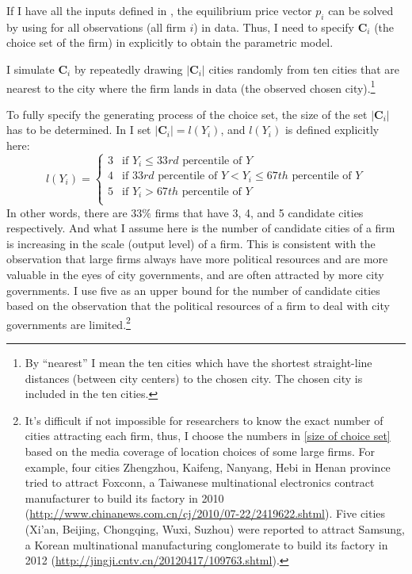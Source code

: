 

If I have all the inputs defined in , the equilibrium price
vector $p_i$ can be solved by using 
for all observations (all firm $i$) in data.
Thus, I need to specify $\mathbf{C}_i$
(the choice set of the firm) in  explicitly to obtain the parametric model.

I simulate $\mathbf{C}_{i}$ by repeatedly drawing
$|\mathbf{C}_{i}|$ cities randomly from ten cities that are nearest
to the city where the firm lands in data (the observed chosen city).\footnote{
    By ``nearest'' I mean the ten cities which have
    the shortest straight-line distances (between city centers) to the chosen city.
    The chosen city is included in the ten cities. }

To fully specify the generating process of the choice set,
the size of the set $|\mathbf{C}_i|$ has to be determined.
In  I set $|\mathbf{C}_i| = l(Y_i)$,
and $l(Y_i)$ is defined explicitly here:
\begin{equation}
    l(Y_i) =
    \begin{cases}
        3 & \text{if $Y_i \leq 33rd \text{ percentile of } Y$} \\
        4 & \text{if $33rd \text{ percentile of } Y
        < Y_i \leq 67th \text{ percentile of } Y$}             \\
        5 & \text{if $Y_i > 67th \text{ percentile of } Y$}    \\
    \end{cases}
    \label{size of choice set}
\end{equation}
In other words, there are $33\%$ firms that have 3, 4, and 5 candidate cities respectively.
And what I assume here is the number of candidate cities of a firm is increasing
in the scale (output level) of a firm. This is consistent with the observation
that large firms
always have more political resources and are more valuable in the eyes of city governments,
and are often attracted by more city governments. I use five as an upper bound for the number
of candidate cities based on the observation that the political resources of
a firm to deal with city governments are limited.\footnote{
    It's difficult if not impossible for researchers to know the exact number of cities attracting
    each firm, thus, I choose the numbers in \eqref{size of choice set} based on the media coverage
    of location choices of some large firms.
    For example, four cities Zhengzhou, Kaifeng, Nanyang, Hebi
    in Henan province tried to attract Foxconn, a Taiwanese multinational electronics contract
    manufacturer
    to build its factory in 2010 (\url{http://www.chinanews.com.cn/cj/2010/07-22/2419622.shtml}).
    Five cities (Xi'an, Beijing, Chongqing, Wuxi, Suzhou) were reported to attract Samsung,
    a Korean multinational manufacturing conglomerate to build its factory in 2012
    (\url{http://jingji.cntv.cn/20120417/109763.shtml}).
}
